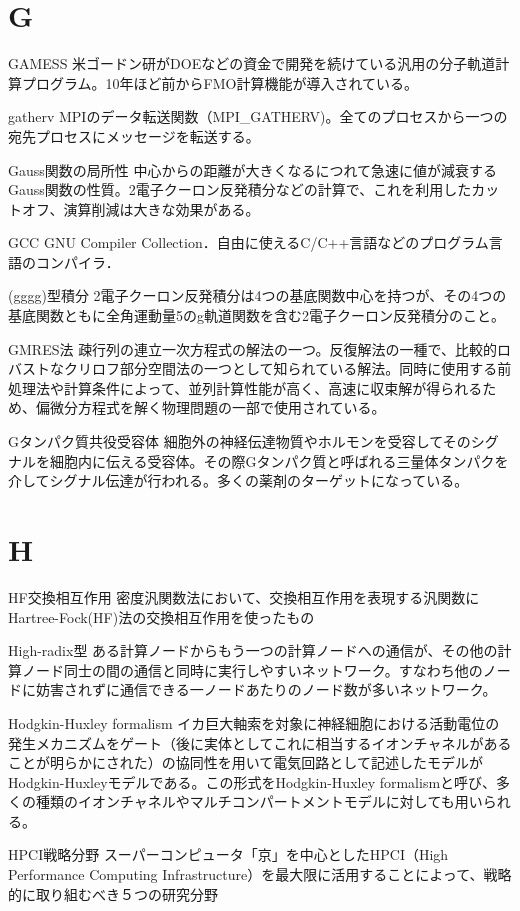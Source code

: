 \begin{用語集}
\section{G}
\item{GAMESS}{}
{米ゴードン研がDOEなどの資金で開発を続けている汎用の分子軌道計算プログラム。10年ほど前からFMO計算機能が導入されている。}
\item{gatherv}{}
{MPIのデータ転送関数（MPI\_GATHERV)。全てのプロセスから一つの宛先プロセスにメッセージを転送する。}
\item{Gauss関数の局所性}{}
{中心からの距離が大きくなるにつれて急速に値が減衰するGauss関数の性質。2電子クーロン反発積分などの計算で、これを利用したカットオフ、演算削減は大きな効果がある。}
\item{GCC}{}
{GNU Compiler Collection．自由に使えるC/C++言語などのプログラム言語のコンパイラ．}
\item{(gg{\textbar}gg)型積分}{}
{2電子クーロン反発積分は4つの基底関数中心を持つが、その4つの基底関数ともに全角運動量5のg軌道関数を含む2電子クーロン反発積分のこと。}
\item{GMRES法}{}
{疎行列の連立一次方程式の解法の一つ。反復解法の一種で、比較的ロバストなクリロフ部分空間法の一つとして知られている解法。同時に使用する前処理法や計算条件によって、並列計算性能が高く、高速に収束解が得られるため、偏微分方程式を解く物理問題の一部で使用されている。}
\item{Gタンパク質共役受容体}{}
{細胞外の神経伝達物質やホルモンを受容してそのシグナルを細胞内に伝える受容体。その際Gタンパク質と呼ばれる三量体タンパクを介してシグナル伝達が行われる。多くの薬剤のターゲットになっている。}
\section{H}
\item{HF交換相互作用}{}
{密度汎関数法において、交換相互作用を表現する汎関数にHartree-Fock(HF)法の交換相互作用を使ったもの}
\item{High-radix型}{}
{ある計算ノードからもう一つの計算ノードへの通信が、その他の計算ノード同士の間の通信と同時に実行しやすいネットワーク。すなわち他のノードに妨害されずに通信できる一ノードあたりのノード数が多いネットワーク。}
\item{Hodgkin-Huxley formalism}{}
{イカ巨大軸索を対象に神経細胞における活動電位の発生メカニズムをゲート（後に実体としてこれに相当するイオンチャネルがあることが明らかにされた）の協同性を用いて電気回路として記述したモデルがHodgkin-Huxleyモデルである。この形式をHodgkin-Huxley formalismと呼び、多くの種類のイオンチャネルやマルチコンパートメントモデルに対しても用いられる。}
\item{HPCI戦略分野}{}
{スーパーコンピュータ「京」を中心としたHPCI（High Performance Computing Infrastructure）を最大限に活用することによって、戦略的に取り組むべき５つの研究分野}

\end{用語集}

